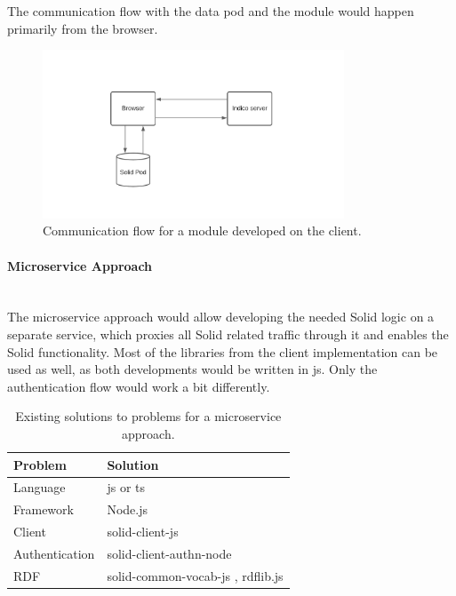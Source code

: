 The communication flow with the data pod and the module would happen primarily from the browser.

\begin{figure}[H]
    \centering
    \includegraphics[width=0.8\textwidth]{prototype/graphs/poc-infrastructure-frontend.jpeg}
    \caption{Communication flow for a module developed on the client.}
    \label{fig:poc-infrastructure-frontend}
\end{figure}
\vspace{0.5cm}
\paragraph{Microservice Approach}\mbox{}\\

The microservice approach would allow developing the needed Solid logic on a separate service, which proxies all Solid related traffic through it and enables the Solid functionality. Most of the libraries from the client implementation can be used as well, as both developments would be written in \gls{js}. Only the authentication flow would work a bit differently.

\begin{table}[h!]
    \centering
    \begin{tabular}{| l | l |} 
    \hline
     Problem & Solution \\
     \hline
      Language & \gls{js} or \gls{ts}  \\
      Framework & Node.js  \\
      Client & solid-client-js \cite{solid-client-js}  \\
      Authentication & solid-client-authn-node \cite{solid-client-authn-node} \\
      RDF & solid-common-vocab-js \cite{solid-common-vocab-js}, rdflib.js \cite{rdflib.js}  \\
    \hline
    \end{tabular}
    \vspace{0.75cm}
    \caption{Existing solutions to problems for a microservice approach.}
    \label{table:2}
\end{table}

